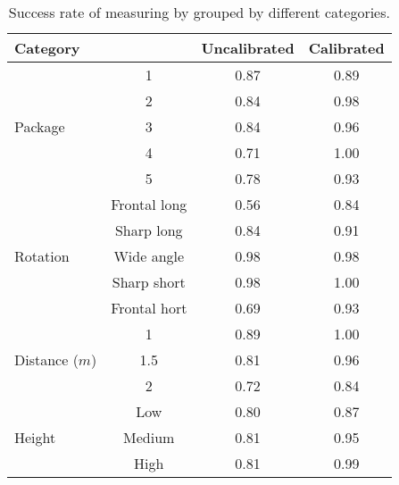 \begin{table}%
\centering
\begin{tabular}{lccc}
\toprule
\multicolumn{2}{l}{Category} & Uncalibrated & Calibrated\\
\midrule

\multirow{5}{*}{Package} 
& 1 & 0.87 & 0.89 \\
& 2 & 0.84 & 0.98 \\
& 3 & 0.84 & 0.96 \\
& 4 & 0.71 & 1.00 \\
& 5 & 0.78 & 0.93 \\
\midrule

\multirow{5}{*}{Rotation}
& Frontal long		& 0.56 &  0.84 \\ 
& Sharp long		& 0.84 &  0.91 \\
& Wide angle 		& 0.98 &  0.98 \\
& Sharp short 		& 0.98 &  1.00 \\
& Frontal hort		& 0.69 &  0.93 \\
\midrule
\multirow{3}{*}{Distance ($m$)} 
& 1 			& 0.89 & 1.00   \\
& 1.5  			& 0.81 & 0.96   \\
& 2 			& 0.72 & 0.84   \\
\midrule
\multirow{3}{*}{Height} 
& Low 		& 0.80 & 0.87  \\
& Medium 	& 0.81 & 0.95  \\
& High		& 0.81 & 0.99  \\
\bottomrule
 \end{tabular}
 \caption{Success rate of measuring by grouped by different categories.}
\label{table:measuring_categories}
\end{table}